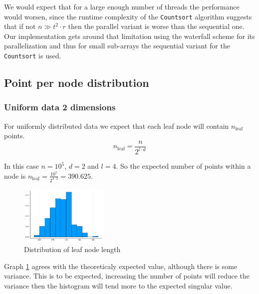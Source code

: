 \documentclass{juliacon}
\begin{document}
We would expect that for a large enough number of threads the performance would worsen,
since the runtime complexity of the \verb|Countsort| algorithm suggests that if not
$n \gg t^2 \cdot r$ then the parallel variant is worse than the sequential one. Our
implementation gets around that limitation using the waterfall scheme for its
parallelization and thus for small sub-arrays the sequential variant for the
\verb|Countsort| is used.


\subsection{Point per node distribution}

\subsubsection{Uniform data 2 dimensions}

For uniformly distributed data we expect that each leaf node will contain
$n_{\textrm{leaf}}$ points.
$$n_{\textrm{leaf}} = \frac{n}{2^{l\cdot d}}$$

In this case $n = 10^5$, $d = 2$ and $l = 4$. So the expected number of points within a
node is $n_{\textrm{leaf}} = \frac{10^5}{2^{4\cdot 2}} =390.625$.

\begin{figure}[!ht]
  \centerline{
    \includegraphics[width=10pc]{figures/experiments/uniform_2d/hist.png}
  }
  \caption{ Distribution of leaf node length }
  \label{uniform-2d-hist}
\end{figure}

Graph \ref{uniform-2d-hist} agrees with the theoreticaly expected value, although there
is some variance. This is to be expected, increasing the number of points will reduce
the variance then the histogram will tend more to the expected singular value.
\end{document}

